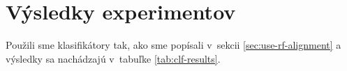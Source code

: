 \section{Výsledky experimentov}


Použili sme klasifikátory tak, ako sme popísali v~sekcii \ref{sec:use-rf-alignment} a výsledky sa nachádzajú v~tabuľke \ref{tab:clf-results}.

